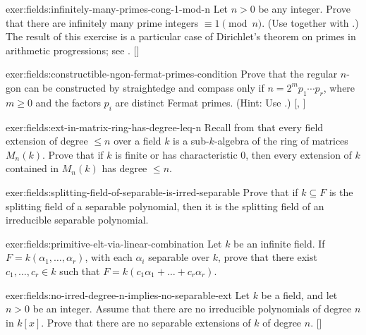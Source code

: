 \begin{exer}{}{exer:fields:infinitely-many-primes-cong-1-mod-n}
  Let $n > 0$ be any integer. Prove that there are infinitely many
  prime integers $\equiv 1 \pmod{n}$. (Use
   together
  with .) The result of
  this exercise is a particular case of Dirichlet's theorem on primes
  in arithmetic progressions; see
  .
  []
\end{exer}
\begin{exer}{}{exer:fields:constructible-ngon-fermat-primes-condition}
  Prove that the regular $n$-gon can be constructed by straightedge
  and compass only if $n = 2^m p_1 \cdots p_r$, where $m \geq 0$ and
  the factors $p_i$ are distinct Fermat primes. (Hint: Use
  .)
  [,
  ]
\end{exer}
\begin{exer}{}{exer:fields:ext-in-matrix-ring-has-degree-leq-n}
  Recall from  that
  every field extension of degree $\leq n$ over a field $k$ is a
  sub-$k$-algebra of the ring of matrices $M_n(k)$.  Prove that if $k$
  is finite or has characteristic $0$, then every extension of $k$
  contained in $M_n(k)$ has degree $\leq n$.
\end{exer}
\begin{exer}{}{exer:fields:splitting-field-of-separable-is-irred-separable}
  Prove that if $k \subseteq F$ is the splitting field of a separable
  polynomial, then it is the splitting field of an irreducible
  separable polynomial.
\end{exer}
\begin{exer}{}{exer:fields:primitive-elt-via-linear-combination}
  Let $k$ be an infinite field. If $F = k(\alpha_1, \dots, \alpha_r)$,
  with each $\alpha_i$ separable over $k$, prove that there exist
  $c_1, \dots, c_r \in k$ such that
  $F = k(c_1\alpha_1 + \dots + c_r\alpha_r)$.
\end{exer}
\begin{exer}{}{exer:fields:no-irred-degree-n-implies-no-separable-ext}
  Let $k$ be a field, and let $n > 0$ be an integer. Assume that there
  are no irreducible polynomials of degree $n$ in $k[x]$. Prove that
  there are no separable extensions of $k$ of degree
  $n$. []
\end{exer}


